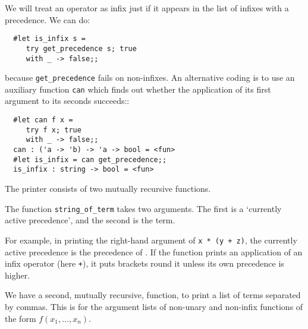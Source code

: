 \begin{slide*}


\vspace*{0.5cm}

We will treat an operator as infix just if it appears in the list of infixes
with a precedence. We can do:

\begin{black}\begin{verbatim}
  #let is_infix s =
     try get_precedence s; true
     with _ -> false;;
\end{verbatim}\end{black}

\noindent because {\black \verb+get_precedence+} fails on non-infixes. An
alternative coding is to use an auxiliary function {\black \tt can} which finds
out whether the application of its first argument to its seconds succeeds::

\begin{black}\begin{verbatim}
  #let can f x =
     try f x; true
     with _ -> false;;
  can : ('a -> 'b) -> 'a -> bool = <fun>
  #let is_infix = can get_precedence;;
  is_infix : string -> bool = <fun>
\end{verbatim}\end{black}

\end{slide*}





\begin{slide*}


\vspace*{0.5cm}

The printer consists of two mutually recursive functions.

The function {\black\verb+string_of_term+} takes two arguments. The first is a
`currently active precedence', and the second is the term.

For example, in printing the right-hand argument of {\black \tt x * (y + z)},
the currently active precedence is the precedence of {\black \tt *}. If the
function prints an application of an infix operator (here {\black \tt +}), it
puts brackets round it unless its own precedence is higher.

We have a second, mutually recursive, function, to print a list of terms
separated by commas. This is for the argument lists of non-unary and non-infix
functions of the form {\red  $f(x_1,\ldots,x_n)$}.

\end{slide*}






